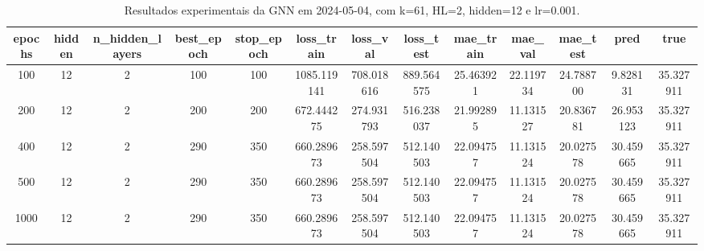 \begin{table}[h]
\centering
\caption{Resultados experimentais da GNN em 2024-05-04, com k=61, HL=2, hidden=12 e lr=0.001.}
\label{tab:gnn_results_k61_hl2_h12_d20240504}
\begin{tabular}{ccccccccccccc}
\toprule
epochs & hidden & n\_hidden\_layers & best\_epoch & stop\_epoch & loss\_train & loss\_val & loss\_test & mae\_train & mae\_val & mae\_test & pred & true \\
\midrule
100 & 12 & 2 & 100 & 100 & 1085.119141 & 708.018616 & 889.564575 & 25.463921 & 22.119734 & 24.788700 & 9.828131 & 35.327911 \\
200 & 12 & 2 & 200 & 200 & 672.444275 & 274.931793 & 516.238037 & 21.992895 & 11.131527 & 20.836781 & 26.953123 & 35.327911 \\
400 & 12 & 2 & 290 & 350 & 660.289673 & 258.597504 & 512.140503 & 22.094757 & 11.131524 & 20.027578 & 30.459665 & 35.327911 \\
500 & 12 & 2 & 290 & 350 & 660.289673 & 258.597504 & 512.140503 & 22.094757 & 11.131524 & 20.027578 & 30.459665 & 35.327911 \\
1000 & 12 & 2 & 290 & 350 & 660.289673 & 258.597504 & 512.140503 & 22.094757 & 11.131524 & 20.027578 & 30.459665 & 35.327911 \\
\bottomrule
\end{tabular}
\end{table}

